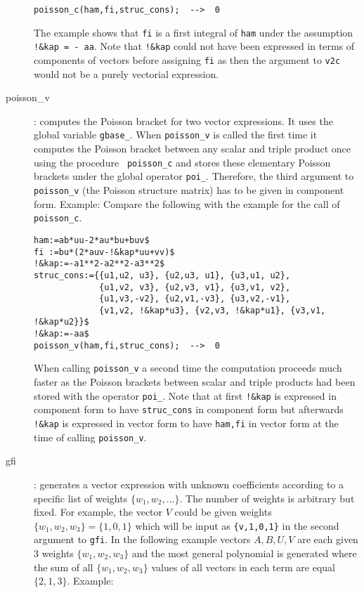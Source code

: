 \documentclass[12pt]{article}
\begin{document}
\begin{description}
\begin{verbatim}
poisson_c(ham,fi,struc_cons);  -->  0 \end{verbatim}
The example shows that {\tt fi} is a first integral of {\tt ham} under the
assumption {\tt !\&kap = - aa}. Note that {\tt !\&kap} could not have
been expressed in terms of components of vectors before assigning {\tt fi}
as then the argument to {\tt v2c} would not be a purely vectorial expression.
  \item[poisson\_v] :
     computes the Poisson bracket for two vector expressions.  It uses
     the global variable {\tt gbase\_}. When {\tt poisson\_v} is
     called the first time it computes the Poisson bracket between any
     scalar and triple product once using the procedure {\tt
     poisson\_c} and stores these elementary Poisson brackets under
     the global operator {\tt poi\_}. Therefore, the third argument to
     {\tt poisson\_v} (the Poisson structure matrix) has to be given
     in component form. Example: Compare the following with the
     example for the call of {\tt poisson\_c}. \begin{verbatim}
ham:=ab*uu-2*au*bu+buv$
fi :=bu*(2*auv-!&kap*uu+vv)$
!&kap:=-a1**2-a2**2-a3**2$
struc_cons:={{u1,u2, u3}, {u2,u3, u1}, {u3,u1, u2},
             {u1,v2, v3}, {u2,v3, v1}, {u3,v1, v2},
             {u1,v3,-v2}, {u2,v1,-v3}, {u3,v2,-v1},
             {v1,v2, !&kap*u3}, {v2,v3, !&kap*u1}, {v3,v1, !&kap*u2}}$
!&kap:=-aa$
poisson_v(ham,fi,struc_cons);  -->  0 \end{verbatim}
     When calling {\tt poisson\_v} a second time the computation proceeds
     much faster as the Poisson brackets between scalar and triple products
     had been stored with the operator {\tt poi\_}.
     Note that at first {\tt !\&kap}
     is expressed in component form to have {\tt struc\_cons} in component
     form but afterwards {\tt !\&kap} is expressed in vector form to have
     {\tt ham,fi} in vector form at the time of calling {\tt poisson\_v}.
  \item[gfi] : generates a vector expression with unknown coefficients
     according to a specific list of weights $\{w_1,w_2,...\}$.
     The number of weights is arbitrary but fixed.
     For example, the vector $V$ could be given weights
     $\{w_1,w_2,w_3\}=\{1,0,1\}$ which will be input as {\tt \{v,1,0,1\}}
     in the second argument to {\tt gfi}.
     In the following example vectors $A,B,U,V$ are each given 3 weights
     $\{w_1,w_2,w_3\}$ and the most general polynomial is generated where the
     sum of all $\{w_1,w_2,w_3\}$ values of all vectors in each term are
     equal $\{2,1,3\}$. Example: \begin{verbatim}

\end{verbatim}
\end{description}
\end{document}
